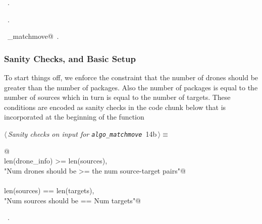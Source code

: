 \documentclass[10pt, english, oneside]{report}
\begin{document}
\begin{flushleft}
\begin{minipage}{\linewidth}
\vspace{-1.5ex}
\footnotesize
\begin{list}{}{\setlength{\itemsep}{-\parsep}\setlength{\itemindent}{-\leftmargin}}
\item \NWtxtMacroDefBy\ .
\item \NWtxtMacroRefIn\ .
\item \NWtxtIdentsDefed\nobreak\  \verb@algo_matchmove@\nobreak\ .
\item{}
\end{list}
\end{minipage}\vspace{4ex}
\end{flushleft}

\subsubsection{Sanity Checks, and Basic Setup}
\label{ssec:sancheck}
To start things off, we enforce the constraint that the number of drones 
should be greater than the number of packages. Also the number of 
packages is equal to the number of sources which in turn is equal to the 
number of targets. These conditions are encoded as sanity checks 
in the code chunk below that is incorporated at the beginning of the 
function 

\begin{flushleft} \small
\begin{minipage}{\linewidth}\label{scrap14}\raggedright\small
{} $\langle\,${\itshape Sanity checks on input for \verb|algo_matchmove|}\nobreak\ {\footnotesize {14b}}$\,\rangle\equiv$
\vspace{-1ex}
\begin{list}{}{} \item
\mbox{}\verb@   @\\
\mbox{}\verb@assert len(drone_info) >= len(sources),\@\\
\mbox{}\verb@   "Num drones should be >= the num source-target pairs"@\\
\mbox{}\verb@@\\
\mbox{}\verb@assert len(sources) == len(targets),\@\\
\mbox{}\verb@   "Num sources should be == Num targets"@\\
\mbox{}\verb@@{\NWsep}
\end{list}
\vspace{-1.5ex}
\footnotesize
\begin{list}{}{\setlength{\itemsep}{-\parsep}\setlength{\itemindent}{-\leftmargin}}
\item \NWtxtMacroRefIn\ .

\item{}
\end{list}
\end{minipage}\vspace{4ex}
\end{flushleft}
\end{document}
